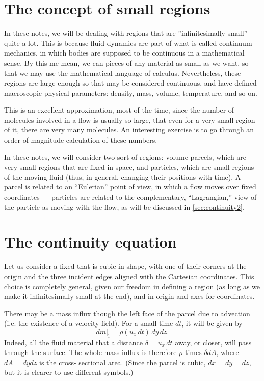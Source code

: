 \section{The concept of small regions}

In these notes, we will be dealing with regions that are ''infinitesimally small''
quite a lot. This is because fluid dynamics are part of what is called
continuum mechanics, in which bodies are supposed to be continuous in
a mathematical sense. By this me mean, we can pieces of any material
as small as we want, so that we may use the mathematical language of calculus.
Nevertheless, these regions are large enough so that may be considered
continuous, and have defined macroscopic physical parameters: density, mass,
volume, temperature, and so on.

This is an excellent approximation, most of the time, since the number of molecules
involved in a flow is usually so large, that even for a very small region of it, there
are very many molecules. An interesting exercise is to go through an order-of-magnitude
calculation of these numbers.

In these notes, we will consider two sort of regions: volume parcels, which are very
small regions that are fixed in space, and particles, which
are small regions of the moving fluid (thus, in general, changing their positions with time).
A parcel is related to an ``Eulerian'' point of view, in which a flow moves over
fixed coordinates --- particles are related to the complementary, ``Lagrangian,'' view of the particle as moving with the flow, as will be discussed in \ref{sec:continuity2}.



\section{The continuity equation}
\label{sec:continuity}

Let us consider a fixed that is cubic in shape, with one of their
corners at the origin and the three incident edges aligned with the
Cartesian coordinates. This choice is completely general, given our
freedom in defining a region (as long as we make it infinitesimally
small at the end), and in origin and axes for coordinates.

There may be a mass influx though the left face of the parcel due
to advection (i.e. the existence of a velocity field). For a small
time $dt$, it will be given by
\[
\left. d m \right|_\text{l} =
\rho ( u_x \, dt) \, dy\, dz .
\]
Indeed, all the fluid material that a distance $\delta= u_x \, dt$
away, or closer, will pass through the surface. The whole mass influx
is therefore $\rho$ times $\delta dA$, where $dA=dy dz$ is the cross-
sectional area. (Since the parcel is cubic, $dx=dy=dz$, but it is
clearer to use different symbols.)

